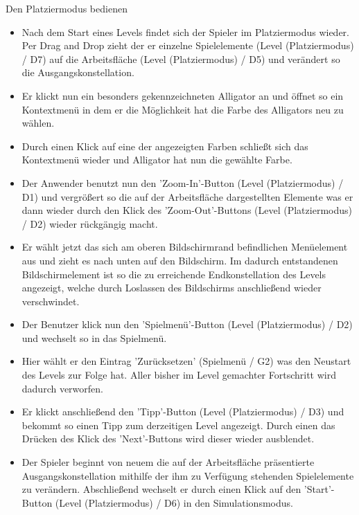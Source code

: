 \begin{requirements}
  	
  	
  	 Den Platziermodus bedienen
  	
	
	\begin{itemize}
			\item Nach dem Start eines Levels findet sich der Spieler im Platziermodus wieder. Per Drag and Drop zieht der er einzelne Spielelemente (Level (Platziermodus) / D7) auf die Arbeitsfläche (Level (Platziermodus) / D5) und verändert so die Ausgangskonstellation.
  			
  			\item Er klickt nun ein besonders gekennzeichneten Alligator an und öffnet so ein Kontextmenü in dem er die Möglichkeit hat die Farbe des Alligators neu zu wählen.
  			
  			\item Durch einen Klick auf eine der angezeigten Farben schließt sich das Kontextmenü wieder und Alligator hat nun die gewählte Farbe.
  			
  			\item Der Anwender benutzt nun den 'Zoom-In'-Button (Level (Platziermodus) / D1) und vergrößert so die auf der Arbeitsfläche dargestellten Elemente was er dann wieder durch den Klick des 'Zoom-Out'-Buttons  (Level (Platziermodus) / D2) wieder rückgängig macht.
  			
  			\item Er wählt jetzt das sich am oberen Bildschirmrand befindlichen Menüelement aus und zieht es nach unten auf den Bildschirm. Im dadurch entstandenen Bildschirmelement ist so die zu erreichende Endkonstellation des Levels angezeigt, welche durch Loslassen des Bildschirms anschließend wieder verschwindet. 
  			
  			\item Der Benutzer klick nun den 'Spielmenü'-Button (Level (Platziermodus) / D2) und wechselt so in das Spielmenü.
  			
  			\item Hier wählt er den Eintrag 'Zurücksetzen' (Spielmenü / G2) was den Neustart des Levels zur Folge hat. Aller bisher im Level gemachter Fortschritt wird dadurch verworfen.
  			
  			\item Er klickt anschließend den 'Tipp'-Button (Level (Platziermodus) / D3) und bekommt so einen Tipp zum derzeitigen Level angezeigt. Durch einen das Drücken des Klick des 'Next'-Buttons wird dieser wieder ausblendet.
  			
  			\item Der Spieler beginnt von neuem die auf der Arbeitsfläche präsentierte Ausgangskonstellation mithilfe der ihm zu Verfügung stehenden Spielelemente zu verändern. Abschließend wechselt er durch einen Klick auf den 'Start'-Button (Level (Platziermodus) / D6) in den Simulationsmodus.
  	\end{itemize}
  	

\end{requirements}
